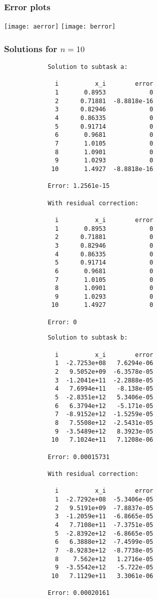 \documentclass{article}
\begin{document}
	\subsubsection{Error plots}
	
	\texttt{[image: aerror]}
	\texttt{[image: berror]}
	
	\subsubsection{Solutions for $n = 10$}
	
	\begin{multicols}{2}
		\begin{verbatim}
			Solution to subtask a:

			  i          x_i        error
			  1       0.8953            0
			  2      0.71881  -8.8818e-16
			  3      0.82946            0
			  4      0.86335            0
			  5      0.91714            0
			  6       0.9681            0
			  7       1.0105            0
			  8       1.0901            0
			  9       1.0293            0
			 10       1.4927  -8.8818e-16

			Error: 1.2561e-15

			With residual correction:

			  i          x_i        error
			  1       0.8953            0
			  2      0.71881            0
			  3      0.82946            0
			  4      0.86335            0
			  5      0.91714            0
			  6       0.9681            0
			  7       1.0105            0
			  8       1.0901            0
			  9       1.0293            0
			 10       1.4927            0

			Error: 0
		\end{verbatim}
		\begin{verbatim}
			Solution to subtask b:

			  i          x_i        error
			  1  -2.7253e+08   7.6294e-06
			  2   9.5052e+09  -6.3578e-05
			  3  -1.2041e+11  -2.2888e-05
			  4   7.6994e+11   -8.138e-05
			  5  -2.8351e+12   5.3406e-05
			  6   6.3794e+12   -5.171e-05
			  7  -8.9152e+12  -1.5259e-05
			  8   7.5508e+12  -2.5431e-05
			  9  -3.5489e+12   8.3923e-05
			 10   7.1024e+11   7.1208e-06

			Error: 0.00015731

			With residual correction:

			  i          x_i        error
			  1  -2.7292e+08  -5.3406e-05
			  2   9.5191e+09  -7.8837e-05
			  3  -1.2059e+11  -6.8665e-05
			  4   7.7108e+11  -7.3751e-05
			  5  -2.8392e+12  -6.8665e-05
			  6   6.3888e+12  -7.4599e-05
			  7  -8.9283e+12  -8.7738e-05
			  8    7.562e+12   1.2716e-05
			  9  -3.5542e+12   -5.722e-05
			 10   7.1129e+11   3.3061e-06

			Error: 0.00020161
		\end{verbatim}
	\end{multicols}
	
\end{document}
